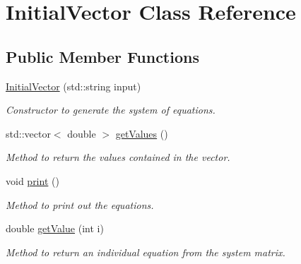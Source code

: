 \hypertarget{class_initial_vector}{}\section{Initial\+Vector Class Reference}
\label{class_initial_vector}
\subsection*{Public Member Functions}
\begin{DoxyCompactItemize}
\item 
\hyperlink{class_initial_vector_a4a8ad49cef57e0644dc18b937265b164}{Initial\+Vector} (std\+::string input)\hypertarget{class_initial_vector_a4a8ad49cef57e0644dc18b937265b164}{}\label{class_initial_vector_a4a8ad49cef57e0644dc18b937265b164}

\begin{DoxyCompactList}\small\item\em Constructor to generate the system of equations. \end{DoxyCompactList}\item 
std\+::vector$<$ double $>$ \hyperlink{class_initial_vector_af01341a5a32b28d6066632959566fecd}{get\+Values} ()\hypertarget{class_initial_vector_af01341a5a32b28d6066632959566fecd}{}\label{class_initial_vector_af01341a5a32b28d6066632959566fecd}

\begin{DoxyCompactList}\small\item\em Method to return the values contained in the vector. \end{DoxyCompactList}\item 
void \hyperlink{class_initial_vector_ae71fa73543bd36443fc19e3c87c7d205}{print} ()\hypertarget{class_initial_vector_ae71fa73543bd36443fc19e3c87c7d205}{}\label{class_initial_vector_ae71fa73543bd36443fc19e3c87c7d205}

\begin{DoxyCompactList}\small\item\em Method to print out the equations. \end{DoxyCompactList}\item 
double \hyperlink{class_initial_vector_a8f822bce7ca795f2be49862c87c5a3e2}{get\+Value} (int i)
\begin{DoxyCompactList}\small\item\em Method to return an individual equation from the system matrix. \end{DoxyCompactList}\end{DoxyCompactItemize}


